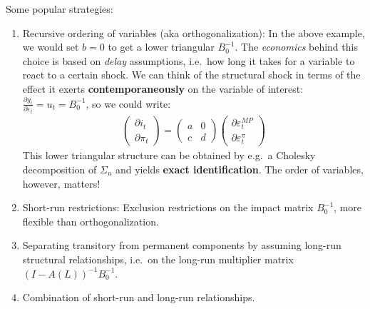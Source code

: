 \begin{enumerate}
Some popular strategies:

\begin{enumerate}

\item
Recursive ordering of variables (aka orthogonalization):
In the above example, we would set \(b=0\) to get a lower triangular \(B_0^{-1}\).
The \emph{economics} behind this choice is based on \emph{delay} assumptions, i.e.\
  how long it takes for a variable to react to a certain shock.
We can think of the structural shock in terms of the effect it exerts \textbf{contemporaneously} on the variable of interest:
\(\frac{\partial y_{t}}{\partial \varepsilon_{t}} = u_{t} = B_0^{-1}\), so we could write:
\begin{align*}
\begin{pmatrix} \partial i_t \\ \partial \pi_t \end{pmatrix}
=
\begin{pmatrix} a & 0 \\ c & d \end{pmatrix}
\begin{pmatrix} \partial \varepsilon_t^{MP} \\ \partial \varepsilon_t^{\pi} \end{pmatrix}
\end{align*}
This lower triangular structure can be obtained by e.g.\
  a Cholesky decomposition of \(\Sigma_u\) and yields \textbf{exact identification}.
The order of variables, however, matters!

\item
Short-run restrictions: Exclusion restrictions on the impact matrix \(B_0^{-1}\), more flexible than orthogonalization.

\item
Separating transitory from permanent components by assuming long-run structural relationships,
  i.e.\ on the long-run multiplier matrix \({(I-A(L))}^{-1} B_0^{-1}\).

\item
Combination of short-run and long-run relationships.


\end{enumerate}
\end{enumerate}
